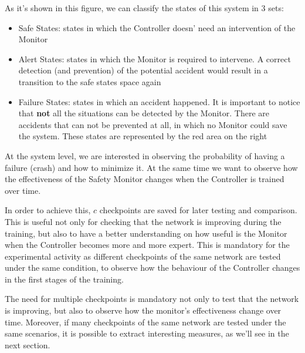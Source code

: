 As it's shown in this figure, we can classify the states of this system in 3 sets:

\begin{itemize}
	\item Safe States: states in which the Controller doesn' need an intervention of the Monitor
	\item Alert States: states in which the Monitor is required to intervene. A correct detection (and prevention) of the potential accident would result in a transition to the safe states space again
	\item Failure States: states in which an accident happened. It is important to notice that \textbf{not} all the situations can be detected by the Monitor. There are accidents that can not be prevented at all, in which no Monitor could save the system. These states are represented by the red area on the right
\end{itemize}


At the system level, we are interested in observing the probability of having a failure (crash) and how to minimize it. At the same time we want to observe how the effectiveness of the Safety Monitor changes when the Controller is trained over time.

In order to achieve this, $c$ checkpoints are saved for later testing and comparison. This is useful not only for checking that the network is improving during the training, but also to have a better understanding on how useful is the Monitor when the Controller becomes more and more expert. This is mandatory for the experimental activity as different checkpoints of the same network are tested under the same condition, to observe how the behaviour of the Controller changes in the first stages of the training.

The need for multiple checkpoints is mandatory not only to test that the network is improving, but also to observe how the monitor's effectiveness change over time. Moreover, if many checkpoints of the same network are tested under the same scenarios, it is possible to extract interesting measures, as we'll see in the next section.

